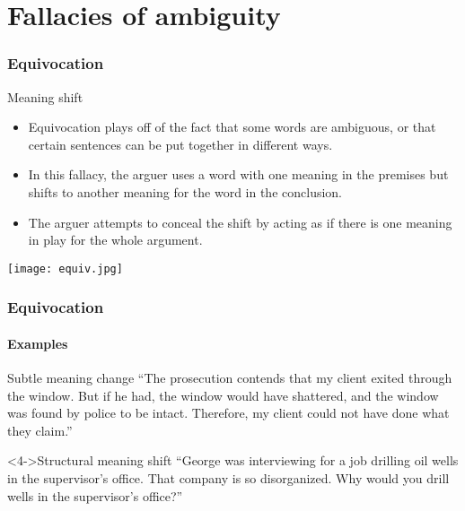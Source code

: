 \documentclass[10pt,letterpaper,xcolor=dvipsnames,handout]{beamer}
\begin{document}
\section{Fallacies of ambiguity}

\begin{frame}
  \frametitle{Equivocation}
  
  \begin{block}{Meaning shift}
    \begin{itemize}
      \item Equivocation plays off of the fact that some words are ambiguous, or that certain sentences can be put together in different ways.
      \item In this fallacy, the arguer uses a word with one meaning in the premises but shifts to another meaning for the word in the conclusion.
      \item The arguer attempts to conceal the shift by acting as if there is one meaning in play for the whole argument.
    \end{itemize}
  \end{block}
  
  
  \begin{center}
    \texttt{[image: equiv.jpg]}
  \end{center}
  
\end{frame}

\begin{frame}
  \frametitle{Equivocation}
  \framesubtitle{Examples}
  
  \begin{block}{Subtle meaning change}
    ``The prosecution contends that my client exited through the window. But if he had, the window\uncover<3->{$_{pane}$} would have shattered, and the window was found by police to be intact. Therefore, my client could not have done what they claim.''
  \end{block}
  
    \begin{block}<4->{Structural meaning shift}
    ``George was \alert<5-5>{interviewing} for a \alert<6->{job} drilling oil wells \alert<5->{in the supervisor's office}.  That company is so disorganized.  Why would you drill wells in the supervisor's office?''
  \end{block}
  
\end{frame}
\end{document}
